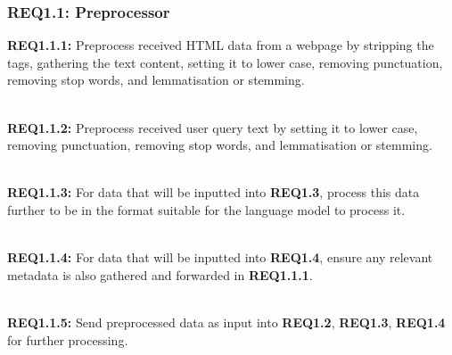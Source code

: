\subsubsection{REQ1.1: Preprocessor}

\textbf{REQ1.1.1:} Preprocess received HTML data from a webpage by stripping the tags, gathering the text content, setting it to lower case, removing punctuation, removing stop words, and lemmatisation or stemming.\par

\textbf{\\REQ1.1.2:} Preprocess received user query text by setting it to lower case, removing punctuation, removing stop words, and lemmatisation or stemming.\par

\textbf{\\REQ1.1.3:} For data that will be inputted into \textbf{REQ1.3}, process this data further to be in the format suitable for the language model to process it.\par

\textbf{\\REQ1.1.4:} For data that will be inputted into \textbf{REQ1.4}, ensure any relevant metadata is also gathered and forwarded in \textbf{REQ1.1.1}.\par

\textbf{\\REQ1.1.5:} Send preprocessed data as input into \textbf{REQ1.2}, \textbf{REQ1.3}, \textbf{REQ1.4} for further processing.\par
